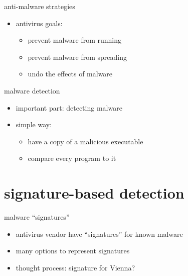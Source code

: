 \begin{frame}{anti-malware strategies}
    \begin{itemize}
    \item antivirus goals:
    \begin{itemize}
    \item prevent malware from running
    \item prevent malware from spreading
    \item undo the effects of malware
    \end{itemize}
    \end{itemize}
\end{frame}

\begin{frame}{malware detection}
    \begin{itemize}
    \item important part: detecting malware
    \item simple way:
        \begin{itemize}
        \item have a copy of a malicious executable
        \item compare every program to it
        \end{itemize}
    \end{itemize}
\end{frame}

\section{signature-based detection}

\begin{frame}{malware ``signatures''}
    \begin{itemize}
    \item antivirus vendor have ``signatures'' for known malware
    \item many options to represent signatures
    \item thought process: signature for Vienna?
    \end{itemize}
\end{frame}

